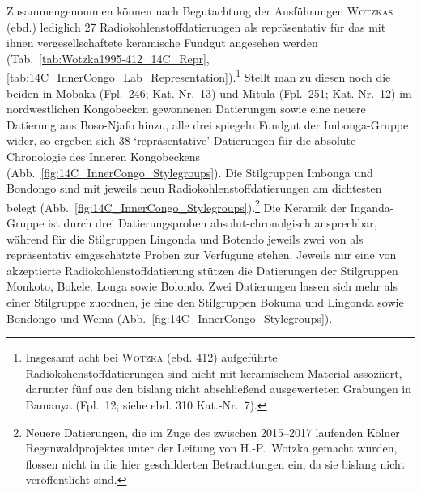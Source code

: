 Zusammengenommen können nach Begutachtung der Ausführungen \textsc{Wotzkas} (ebd.) lediglich 27 Radiokohlenstoffdatierungen als repräsentativ für das mit ihnen vergesellschaftete keramische Fundgut angesehen werden (Tab.~\ref{tab:Wotzka1995-412_14C_Repr}, \ref{tab:14C_InnerCongo_Lab_Representation}).\footnote{Insgesamt acht bei \textsc{Wotzka} (ebd. 412) aufgeführte Radiokohenstoffdatierungen sind nicht mit keramischem Material assoziiert, darunter fünf aus den bislang nicht abschließend ausgewerteten Grabungen in Bamanya (Fpl.~12; siehe ebd. 310 Kat.-Nr.~7).} Stellt man zu diesen noch die beiden in Mobaka (Fpl.~246; Kat.-Nr.~13) und Mitula (Fpl.~251; Kat.-Nr.~12) im nordwestlichen Kongobecken gewonnenen Datierungen sowie eine neuere Datierung aus Boso-Njafo \parencite[Fpl.~149;][]{Kahlheber.2014} hinzu, alle drei spiegeln Fundgut der Imbonga-Gruppe wider, so ergeben sich 38 \enquote*{repräsentative} Datierungen für die absolute Chronologie des Inneren Kongobeckens (Abb.~\ref{fig:14C_InnerCongo_Stylegroups}). Die Stilgruppen Imbonga und Bondongo sind mit jeweils neun Radiokohlenstoffdatierungen am dichtesten belegt (Abb.~\ref{fig:14C_InnerCongo_Stylegroups}).\footnote{Neuere Datierungen, die im Zuge des zwischen 2015--2017 laufenden Kölner Regenwaldprojektes unter der Leitung von H.-P.~Wotzka gemacht wurden, flossen nicht in die hier geschilderten Betrachtungen ein, da sie bislang nicht veröffentlicht sind.} Die Keramik der Inganda-Gruppe ist durch drei Datierungsproben absolut-chronolgisch ansprechbar, während für die Stilgruppen Lingonda und Botendo jeweils zwei von \textcite{Wotzka.1995} als repräsentativ eingeschätzte Proben zur Verfügung stehen. Jeweils nur eine von \textcite{Wotzka.1995} akzeptierte Radiokohlenstoffdatierung stützen die Datierungen der Stilgruppen Monkoto, Bokele, Longa sowie Bolondo. Zwei Datierungen lassen sich mehr als einer Stilgruppe zuordnen, je eine den Stilgruppen Bokuma und Lingonda sowie Bondongo und Wema (Abb.~\ref{fig:14C_InnerCongo_Stylegroups}).

